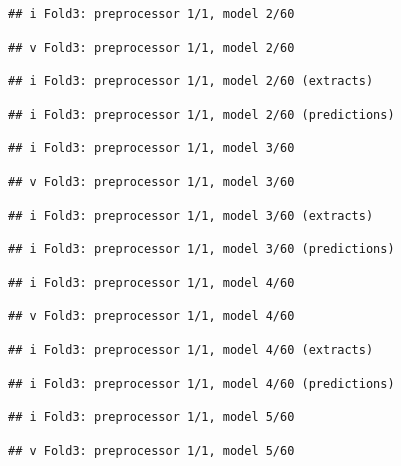 \documentclass[
]{article}
\begin{document}
\begin{verbatim}
## i Fold3: preprocessor 1/1, model 2/60
\end{verbatim}

\begin{verbatim}
## v Fold3: preprocessor 1/1, model 2/60
\end{verbatim}

\begin{verbatim}
## i Fold3: preprocessor 1/1, model 2/60 (extracts)
\end{verbatim}

\begin{verbatim}
## i Fold3: preprocessor 1/1, model 2/60 (predictions)
\end{verbatim}

\begin{verbatim}
## i Fold3: preprocessor 1/1, model 3/60
\end{verbatim}

\begin{verbatim}
## v Fold3: preprocessor 1/1, model 3/60
\end{verbatim}

\begin{verbatim}
## i Fold3: preprocessor 1/1, model 3/60 (extracts)
\end{verbatim}

\begin{verbatim}
## i Fold3: preprocessor 1/1, model 3/60 (predictions)
\end{verbatim}

\begin{verbatim}
## i Fold3: preprocessor 1/1, model 4/60
\end{verbatim}

\begin{verbatim}
## v Fold3: preprocessor 1/1, model 4/60
\end{verbatim}

\begin{verbatim}
## i Fold3: preprocessor 1/1, model 4/60 (extracts)
\end{verbatim}

\begin{verbatim}
## i Fold3: preprocessor 1/1, model 4/60 (predictions)
\end{verbatim}

\begin{verbatim}
## i Fold3: preprocessor 1/1, model 5/60
\end{verbatim}

\begin{verbatim}
## v Fold3: preprocessor 1/1, model 5/60
\end{verbatim}
\end{document}
